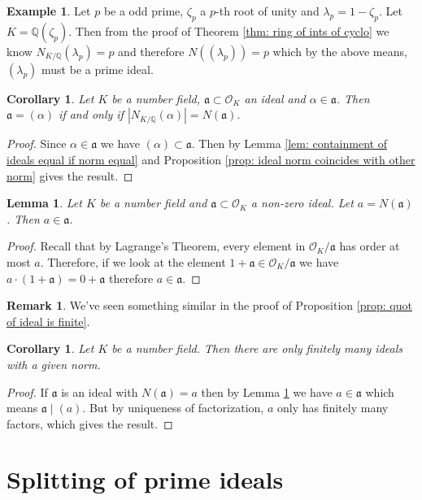 \documentclass[11pt,a4paper]{report}
\theoremstyle{plain}
\newtheorem{lem}[subsection]{Lemma}
\newtheorem{cor}[subsection]{Corollary}
\theoremstyle{definition}
\newtheorem{exmp}[subsection]{Example}
\theoremstyle{definition}
\newtheorem{rmrk}[subsection]{Remark}
\def\QQ{\mathbb{Q}}
\def \a{\alpha}
\def \lam {\lambda}
\def \OO {\mathcal{O}}
\def\gotha{\mathfrak{a}}
\begin{document}
	\begin{exmp}
		Let $p$ be a odd prime, $\zeta_p$ a $p$-th root of unity and $\lam_p=1-\zeta_p$. Let $K=\QQ(\zeta_p)$. Then  from the proof of Theorem \ref{thm: ring of ints of cyclo} we know $N_{K/\QQ}(\lam_p)=p$ and therefore  $N((\lam_p))=p$ which by the above means, $(\lam_p)$ must be a prime ideal.
	\end{exmp}
	
	\begin{cor}
		Let $K$ be a number field, $\gotha \subset \OO_K$ an ideal and $\a \in \gotha$. Then $\gotha=(\a)$ if and only if $|N_{K/\QQ}(\a)|=N(\gotha)$.
	\end{cor}
	
	\begin{proof}
		Since $\a \in \gotha$ we have $(\a) \subset \gotha$. Then by Lemma \ref{lem: containment of ideals equal if norm equal} and Proposition \ref{prop: ideal norm coincides with other norm} gives the result.
	\end{proof}
	
	\begin{lem}\label{lem: ideal contains its norm}
		Let $K$ be a number field and $\gotha \subset \OO_K$ a non-zero ideal. Let $a=N(\gotha)$. Then $a \in \gotha$.
	\end{lem}
	\begin{proof}
		Recall that by Lagrange's Theorem, every element in $\OO_K/\gotha$ has order at most $a$. Therefore, if we look at the element $1+\gotha \in \OO_K/\gotha$ we have $a\cdot (1+\gotha)=0 +\gotha$ therefore $a \in \gotha$. 
	\end{proof}
	
	\begin{rmrk}
		We've seen something similar in the proof of Proposition \ref{prop: quot of ideal is finite}.
	\end{rmrk}
	
	
	\begin{cor}\label{cor: fin many ideals of given norm}
		Let $K$ be a number field. Then there are only finitely many ideals with a given norm.
	\end{cor}
	\begin{proof}
		If $\gotha$ is an ideal with $N(\gotha)=a$ then by Lemma \ref{lem: ideal contains its norm} we have $a \in \gotha$ which means $\gotha \mid (a)$. But by uniqueness of factorization, $a$ only has finitely many factors, which gives the result.
	\end{proof}
	
	
	\section{Splitting of prime ideals}
	
\end{document}

